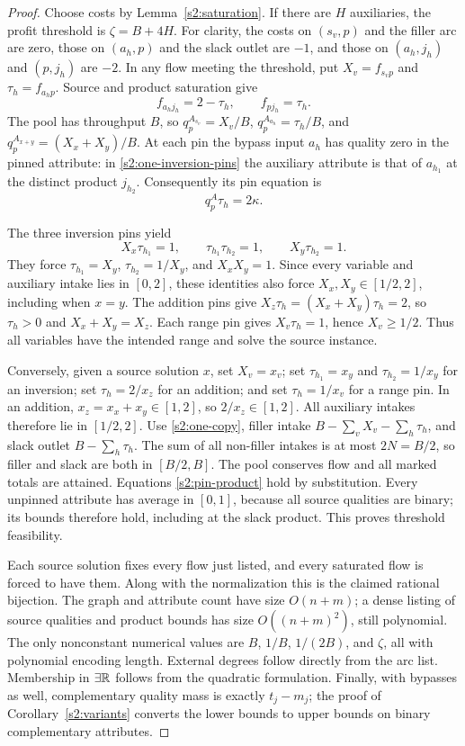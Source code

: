 \begin{proof}
Choose costs by Lemma~\ref{s2:saturation}. If there are $H$ auxiliaries,
the profit threshold is $\zeta=B+4H$. For clarity, the costs on
$(s_v,p)$ and the filler arc are zero, those on $(a_h,p)$ and the
slack outlet are $-1$, and those on $(a_h,j_h)$ and $(p,j_h)$ are $-2$.
In any flow meeting the threshold, put $X_v=f_{s_vp}$ and
$\tau_h=f_{a_hp}$. Source and product saturation give
\begin{equation}
 f_{a_hj_h}=2-\tau_h,\qquad f_{pj_h}=\tau_h.\label{s2:one-copy}
\end{equation}
The pool has throughput $B$, so
$q_p^{A_{s_v}}=X_v/B$, $q_p^{A_{a_h}}=\tau_h/B$, and
$q_p^{A_{x+y}}=(X_x+X_y)/B$. At each pin the bypass input $a_h$
has quality zero in the pinned attribute: in
\eqref{s2:one-inversion-pins} the auxiliary attribute is that of
$a_{h_1}$ at the distinct product $j_{h_2}$. Consequently its pin
equation is
\begin{equation}
 q_p^A\tau_h=2\kappa.\label{s2:pin-product}
\end{equation}

The three inversion pins yield
\[
 X_x\tau_{h_1}=1,\qquad
 \tau_{h_1}\tau_{h_2}=1,\qquad X_y\tau_{h_2}=1.
\]
They force $\tau_{h_1}=X_y$, $\tau_{h_2}=1/X_y$, and $X_xX_y=1$.
Since every variable and auxiliary intake lies in $[0,2]$, these
identities also force $X_x,X_y\in[1/2,2]$, including when $x=y$.
The addition pins give
$X_z\tau_h=(X_x+X_y)\tau_h=2$, so $\tau_h>0$ and
$X_x+X_y=X_z$. Each range pin gives $X_v\tau_h=1$, hence
$X_v\ge1/2$. Thus all variables have the intended range and solve
the source instance.

Conversely, given a source solution $x$, set $X_v=x_v$; set
$\tau_{h_1}=x_y$ and $\tau_{h_2}=1/x_y$ for an inversion;
set $\tau_h=2/x_z$ for an addition; and set $\tau_h=1/x_v$ for
a range pin. In an addition, $x_z=x_x+x_y\in[1,2]$, so
$2/x_z\in[1,2]$. All auxiliary intakes therefore lie in $[1/2,2]$.
Use \eqref{s2:one-copy}, filler intake
$B-\sum_vX_v-\sum_h\tau_h$, and slack outlet
$B-\sum_h\tau_h$. The sum of all non-filler intakes is at most
$2N=B/2$, so filler and slack are both in $[B/2,B]$.
The pool conserves flow and all marked totals are attained.
Equations \eqref{s2:pin-product} hold by substitution. Every unpinned
attribute has average in $[0,1]$, because all source qualities are
binary; its bounds therefore hold, including at the slack product.
This proves threshold feasibility.

Each source solution fixes every flow just listed, and every saturated
flow is forced to have them. Along with the normalization this is the
claimed rational bijection. The graph and attribute count have size
$O(n+m)$; a dense listing of source qualities and product bounds has
size $O((n+m)^2)$, still polynomial. The only nonconstant numerical
values are $B$, $1/B$, $1/(2B)$, and $\zeta$, all with polynomial
encoding length. External degrees follow directly from the arc list.
Membership in $\exists\mathbb R$ follows from the quadratic formulation. Finally,
with bypasses as well, complementary quality mass is exactly $t_j-m_j$;
the proof of Corollary~\ref{s2:variants} converts the lower bounds to
upper bounds on binary complementary attributes.
\end{proof}

